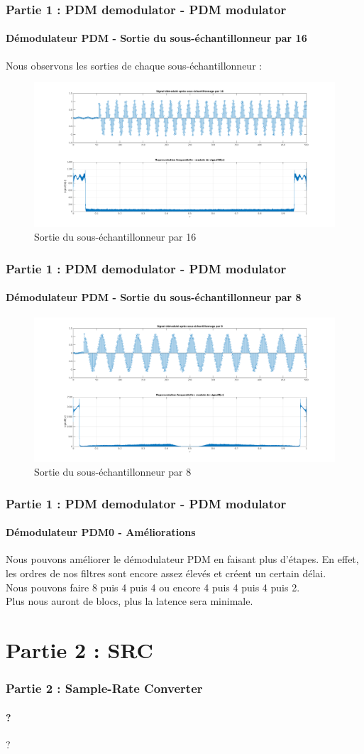 \documentclass[
10pt,
aspectratio=169,
]{beamer}
\begin{document}
\begin{frame}
\frametitle{Partie 1 : PDM demodulator - PDM modulator} 
\framesubtitle{Démodulateur PDM - Sortie du sous-échantillonneur par 16} 
Nous observons les sorties de chaque sous-échantillonneur : 
\begin{figure}[h]
    \centering
    \includegraphics[scale=0.2]{Images/signal16.png}
    \caption{Sortie du sous-échantillonneur par 16}
    \label{fig:sig16}
\end{figure}
\end{frame}

\begin{frame}
\frametitle{Partie 1 : PDM demodulator - PDM modulator} 
\framesubtitle{Démodulateur PDM - Sortie du sous-échantillonneur par 8} 
\begin{figure}[h]
    \centering
    \includegraphics[scale=0.2]{Images/signal8.png}
    \caption{Sortie du sous-échantillonneur par 8}
    \label{fig:sig8}
\end{figure}
\end{frame}

\begin{frame}
\frametitle{Partie 1 : PDM demodulator - PDM modulator} 
\framesubtitle{Démodulateur PDM0 - Améliorations} 
Nous pouvons améliorer le démodulateur PDM en faisant plus d'étapes. En effet, les ordres de nos filtres sont encore assez élevés et créent un certain délai.\\
Nous pouvons faire {8 puis 4 puis 4} ou encore {4 puis 4 puis 4 puis 2}.\\
Plus nous auront de blocs, plus la latence sera minimale.
\end{frame}

\section{Partie 2 : SRC}
\begin{frame} 
\frametitle{Partie 2 : Sample-Rate Converter} 
\framesubtitle{?} 
?
\end{frame}
\end{document}
